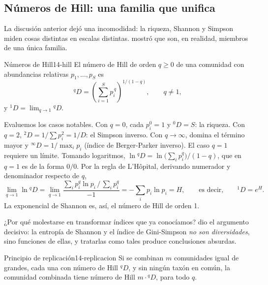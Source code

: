 \subsection{Números de Hill: una familia que unifica}\label{sec:14-hill}

La discusión anterior dejó una incomodidad: la riqueza, Shannon y Simpson miden cosas distintas en escalas distintas. \textcite{c14-hill1973} mostró que son, en realidad, miembros de una única familia.

\begin{definicion}{Números de Hill}{14-hill}
El número de Hill de orden $q \ge 0$ de una comunidad con abundancias relativas $p_1,\dots,p_S$ es
\begin{equation}\label{eq:14-hill}
{}^{q}D = \left(\sum_{i=1}^{S} p_i^{\,q}\right)^{1/(1-q)}, \qquad q \ne 1,
\end{equation}
y ${}^{1}D = \lim_{q\to1} {}^{q}D$.
\end{definicion}

\begin{simbolos}
\end{simbolos}

Evaluemos los casos notables. Con $q=0$, cada $p_i^0 = 1$ y ${}^0D = S$: la riqueza. Con $q=2$, ${}^2D = 1/\sum p_i^2 = 1/D$: el Simpson inverso. Con $q\to\infty$, domina el término mayor y ${}^{\infty}D = 1/\max_i p_i$ (índice de Berger-Parker inverso). El caso $q=1$ requiere un límite. Tomando logaritmos, $\ln {}^qD = \ln\bigl(\sum_i p_i^q\bigr)/(1-q)$, que en $q=1$ es de la forma $0/0$. Por la regla de L'Hôpital, derivando numerador y denominador respecto de $q$,
\begin{equation}\label{eq:14-hill1}
\lim_{q\to1}\ln {}^qD = \lim_{q\to1}\frac{\sum_i p_i^q \ln p_i \,/\, \sum_i p_i^q}{-1} = -\sum_i p_i \ln p_i = H,
\qquad\text{es decir,}\qquad {}^1D = e^{H}.
\end{equation}
La exponencial de Shannon es, así, el número de Hill de orden 1.

¿Por qué molestarse en transformar índices que ya conocíamos? \textcite{c14-jost2006} dio el argumento decisivo: la entropía de Shannon y el índice de Gini-Simpson \emph{no son diversidades}, sino funciones de ellas, y tratarlas como tales produce conclusiones absurdas.

\begin{teorema}{Principio de replicación}{14-replicacion}
Si se combinan $m$ comunidades igual de grandes, cada una con número de Hill ${}^qD$, y sin ningún taxón en común, la comunidad combinada tiene número de Hill $m\cdot{}^qD$, para todo $q$.
\end{teorema}

